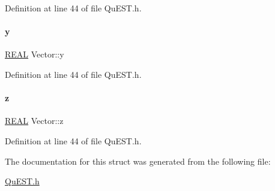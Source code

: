 Definition at line 44 of file Qu\+E\+S\+T.\+h.

\mbox{\label{structVector_a375ca805d4c808a53d7c4e0c737ae3de}} 
\paragraph{\texorpdfstring{y}{y}}
{\footnotesize\ttfamily \mbox{\hyperlink{QuEST__precision_8h_a4b654506f18b8bfd61ad2a29a7e38c25}{R\+E\+AL}} Vector\+::y}



Definition at line 44 of file Qu\+E\+S\+T.\+h.

\mbox{\label{structVector_ad4e863651be7d6b7e2b28cd7445a0ccf}} 
\paragraph{\texorpdfstring{z}{z}}
{\footnotesize\ttfamily \mbox{\hyperlink{QuEST__precision_8h_a4b654506f18b8bfd61ad2a29a7e38c25}{R\+E\+AL}} Vector\+::z}



Definition at line 44 of file Qu\+E\+S\+T.\+h.



The documentation for this struct was generated from the following file\+:\begin{DoxyCompactItemize}
\item 
\mbox{\hyperlink{QuEST_8h}{Qu\+E\+S\+T.\+h}}\end{DoxyCompactItemize}

